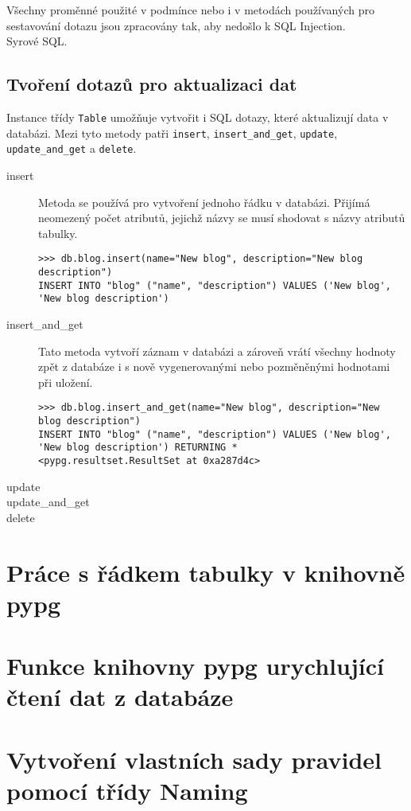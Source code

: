 \documentclass[11pt]{article}
\begin{document}
Všechny proměnné použité v podmínce nebo i v metodách používaných pro sestavování dotazu jsou zpracovány tak, aby nedošlo k SQL Injection. \\
Syrové SQL.

\subsection{Tvoření dotazů pro aktualizaci dat}

Instance třídy \lstinline[style=inline]|Table| umožňuje vytvořit i SQL dotazy, které aktualizují data v databázi. Mezi tyto metody patři \lstinline[style=inline]|insert|, \lstinline[style=inline]|insert_and_get|, \lstinline[style=inline]|update|, \lstinline[style=inline]|update_and_get| a \lstinline[style=inline]|delete|.

\begin{description}
\item[insert] Metoda se používá pro vytvoření jednoho řádku v databázi. Přijímá neomezený počet atributů, jejichž názvy se musí shodovat s názvy atributů tabulky.
\begin{lstlisting}[style=python]
>>> db.blog.insert(name="New blog", description="New blog description")
INSERT INTO "blog" ("name", "description") VALUES ('New blog', 'New blog description')
\end{lstlisting}
\item[insert\_and\_get] Tato metoda vytvoří záznam v databázi a zároveň vrátí všechny hodnoty zpět z databáze i s nově vygenerovanými nebo pozměněnými hodnotami při uložení.
\begin{lstlisting}[style=python]
>>> db.blog.insert_and_get(name="New blog", description="New blog description")
INSERT INTO "blog" ("name", "description") VALUES ('New blog', 'New blog description') RETURNING *
<pypg.resultset.ResultSet at 0xa287d4c>
\end{lstlisting}
\item[update]
\item[update\_and\_get]
\item[delete]
\end{description}

\section{Práce s řádkem tabulky v knihovně pypg}

\section{Funkce knihovny pypg urychlující čtení dat z databáze}

\section{Vytvoření vlastních sady pravidel pomocí třídy Naming}
\end{document}
